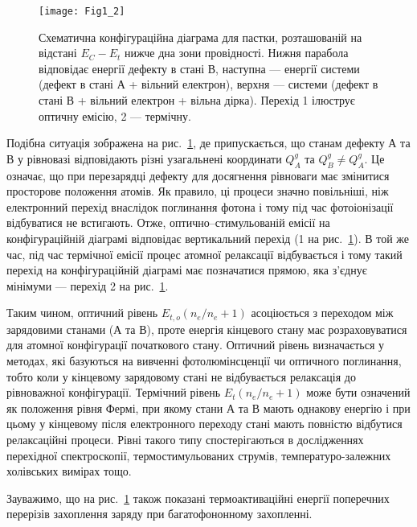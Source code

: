\begin{figure}[t]
\center
\vspace{-5mm}
\texttt{[image: Fig1\_2]}
\vspace{-3mm}
\caption{Схематична конфігураційна діаграма для пастки,
розташованій на відстані $E_C-E_{t}$ нижче дна зони провідності.
Нижня парабола відповідає енергії дефекту в стані В,
наступна --- енергії системи (дефект в стані А + вільний електрон),
верхня --- системи (дефект в стані В + вільний електрон + вільна дірка). %
Перехід 1 ілюструє оптичну емісію, 2 --- термічну.}
\vspace{-3mm}
\label{F12}
\end{figure}

Подібна ситуація зображена на рис.~\ref{F12},
де припускається, що станам дефекту А та В у рівновазі
відповідають різні узагальнені координати $Q_A^g$ та $Q_B^g\neq Q_A^g$.
Це означає, що при перезарядці дефекту для досягнення рівноваги
має змінитися просторове положення атомів.
Як правило, ці процеси значно повільніші, ніж електронний перехід
внаслідок поглинання фотона і тому під час фотоіонізації відбуватися не встигають.
Отже, оптично--стимульованій емісії на конфігураційній діаграмі відповідає вертикальний перехід
(1 на рис.~\ref{F12}).
В той же час, під час термічної емісії процес атомної релаксації  відбувається і тому
такий перехід на конфігураційній діаграмі має позначатися прямою, яка з'єднує мінімуми ---
перехід 2 на рис.~\ref{F12}.

Таким чином, оптичний рівень $E_{t,o}(n_e/n_e+1)$ асоціюється
з переходом між зарядовими станами (А та В), проте енергія кінцевого
стану має розраховуватися для атомної конфігурації початкового стану.
Оптичний рівень визначається у методах, які базуються на вивченні фотолюмінсценції
чи оптичного поглинання, тобто коли у кінцевому
зарядовому стані не відбувається релаксація до рівноважної конфігурації.
Термічний рівень $E_{t}(n_e/n_e+1)$ може бути означений як положення рівня Фермі,
при якому стани А та В мають однакову енергію і при цьому у кінцевому після електронного переходу стані
мають повністю відбутися релаксаційні процеси.
Рівні такого типу спостерігаються в дослідженнях перехідної спектроскопії,
термостимульованих струмів, температуро-залежних холівських вимірах тощо.

Зауважимо, що на рис.~\ref{F12} також показані термоактиваційні енергії поперечних перерізів захоплення 
заряду при багатофононному захопленні.